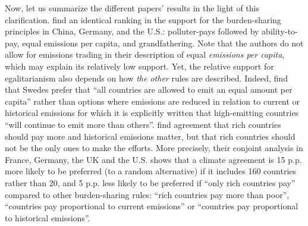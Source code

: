 Now, let us summarize the different papers' results in the light of this clarification. 
\citet{schleich_citizens_2016} find an identical ranking in the support for the burden-sharing principles in China, Germany, and the U.S.: polluter-pays followed by ability-to-pay, equal emissions per capita, and grandfathering. 
Note that the authors do not allow for emissions trading in their description of equal \textit{emissions per capita}, which may explain its relatively low support. 
Yet, the relative support for egalitarianism also depends on how \textit{the other} rules are described. Indeed, \citet{carlsson_is_2011} find that Swedes prefer that ``all countries are allowed to emit an equal amount per capita'' rather than options where emissions are reduced in relation to current or historical emissions for which it is explicitly written that high-emitting countries ``will continue to emit more than others''. 
\citet{bechtel_mass_2013} find agreement that rich countries should pay more and historical emissions matter, but that rich countries should not be the only ones to make the efforts. More precisely, their conjoint analysis in France, Germany, the UK and the U.S. shows that a climate agreement is 15 p.p. more likely to be preferred  (to a random alternative) if it includes 160 countries rather than 20, and 5 p.p. less likely to be preferred if ``only rich countries pay'' compared to other burden-sharing rules: ``rich countries pay more than poor'', ``countries pay proportional to current emissions'' or ``countries pay proportional to historical emissions''. %
